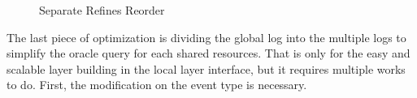 \begin{figure}
%
\caption{Separate Refines Reorder}
\label{fig:chapter:conlink:separate-refines-reorder}
\end{figure}
The last piece of optimization is dividing the global log into the multiple logs to simplify the oracle query for each shared resources. 
That is only for the easy and scalable layer building in the local layer interface, 
but it requires multiple works to do. 
First, 
the modification on the event type is necessary. 
